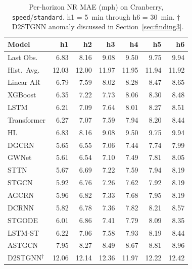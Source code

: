 \documentclass[a4paper]{cas-sc}
\begin{document}
\begin{table}[h]
\centering
\caption{Per-horizon NR MAE (mph) on Cranberry,
         \texttt{speed}/\texttt{standard}.
         h1 = 5~min through h6 = 30~min.
         $\dagger$~D2STGNN anomaly discussed in
         Section~\ref{sec:finding3}.}
\label{tab:per_horizon_cranberry}
\small
\begin{tabular}{lrrrrrr}
\toprule
Model & h1 & h2 & h3 & h4 & h5 & h6 \\
\midrule
Last Obs.          &  6.83 &  8.16 &  9.08 &  9.50 &  9.75 &  9.94 \\
Hist.\ Avg.        & 12.03 & 12.00 & 11.97 & 11.95 & 11.94 & 11.92 \\
Linear AR          &  6.79 &  7.59 &  8.02 &  8.28 &  8.47 &  8.65 \\
XGBoost            &  6.35 &  7.22 &  7.73 &  8.06 &  8.30 &  8.48 \\
\midrule
LSTM               &  6.21 &  7.09 &  7.64 &  8.01 &  8.27 &  8.51 \\
Transformer        &  6.27 &  7.07 &  7.59 &  7.94 &  8.20 &  8.44 \\
\midrule
HL                 &  6.83 &  8.16 &  9.08 &  9.50 &  9.75 &  9.94 \\
DGCRN              &  5.65 &  6.55 &  7.06 &  7.44 &  7.74 &  7.99 \\
GWNet              &  5.61 &  6.54 &  7.10 &  7.49 &  7.81 &  8.05 \\
STTN               &  5.67 &  6.69 &  7.22 &  7.59 &  7.94 &  8.19 \\
STGCN              &  5.92 &  6.76 &  7.26 &  7.62 &  7.92 &  8.19 \\
AGCRN              &  5.96 &  6.82 &  7.33 &  7.68 &  7.95 &  8.19 \\
DCRNN              &  5.82 &  6.78 &  7.36 &  7.82 &  8.21 &  8.57 \\
STGODE             &  6.01 &  6.86 &  7.41 &  7.79 &  8.09 &  8.35 \\
LSTM-ST            &  6.22 &  7.06 &  7.58 &  7.93 &  8.19 &  8.44 \\
ASTGCN             &  7.95 &  8.27 &  8.49 &  8.67 &  8.81 &  8.96 \\

D2STGNN$^\dagger$  & 12.06 & 12.14 & 12.36 & 11.97 & 12.22 & 12.42 \\
\bottomrule
\end{tabular}
\end{table}

\end{document}
